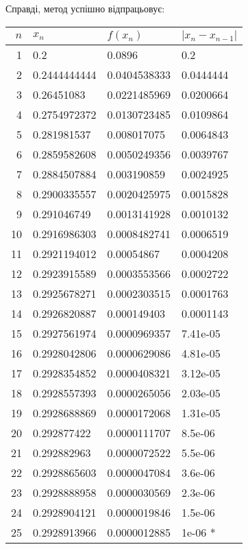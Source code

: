 Справді, метод успішно відпрацьовує:
\begin{table}[H]
    \centering
    \begin{tabular}{|r|l|l|l|}
        \hline
        $n$ & $x_n$ & $f(x_n)$ & $|x_n-x_{n-1}|$ \\ \hline
         1 & 0.2          & 0.0896       & 0.2 \\
        2 & 0.2444444444 & 0.0404538333 & 0.0444444 \\
        3 & 0.26451083   & 0.0221485969 & 0.0200664 \\
        4 & 0.2754972372 & 0.0130723485 & 0.0109864 \\
        5 & 0.281981537  & 0.008017075  & 0.0064843 \\
        6 & 0.2859582608 & 0.0050249356 & 0.0039767 \\
        7 & 0.2884507884 & 0.003190859  & 0.0024925 \\
        8 & 0.2900335557 & 0.0020425975 & 0.0015828 \\
        9 & 0.291046749  & 0.0013141928 & 0.0010132 \\
        10 & 0.2916986303 & 0.0008482741 & 0.0006519 \\
        11 & 0.2921194012 & 0.00054867   & 0.0004208 \\
        12 & 0.2923915589 & 0.0003553566 & 0.0002722 \\
        13 & 0.2925678271 & 0.0002303515 & 0.0001763 \\
        14 & 0.2926820887 & 0.000149403  & 0.0001143 \\
        15 & 0.2927561974 & 0.0000969357 & 7.41e-05 \\
        16 & 0.2928042806 & 0.0000629086 & 4.81e-05 \\
        17 & 0.2928354852 & 0.0000408321 & 3.12e-05 \\
        18 & 0.2928557393 & 0.0000265056 & 2.03e-05 \\
        19 & 0.2928688869 & 0.0000172068 & 1.31e-05 \\
        20 & 0.292877422  & 0.0000111707 & 8.5e-06 \\
        21 & 0.292882963  & 0.0000072522 & 5.5e-06 \\
        22 & 0.2928865603 & 0.0000047084 & 3.6e-06 \\
        23 & 0.2928888958 & 0.0000030569 & 2.3e-06 \\
        24 & 0.2928904121 & 0.0000019846 & 1.5e-06 \\
        25 & 0.2928913966 & 0.0000012885 & 1e-06 * \\ \hline
    \end{tabular}
\end{table}

